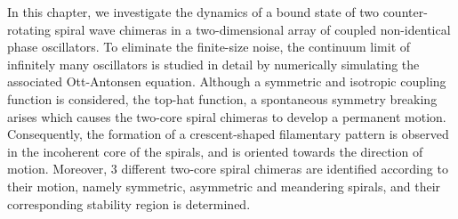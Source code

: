 In this chapter, we investigate the dynamics of a bound state of two counter-rotating spiral wave chimeras
 in a two-dimensional array of coupled non-identical
phase oscillators. To eliminate the finite-size noise, the
continuum limit of infinitely many oscillators is studied in detail
by numerically simulating the
associated Ott-Antonsen equation. Although a symmetric and isotropic coupling function is considered,
the top-hat function, a spontaneous symmetry breaking arises which causes
the two-core spiral chimeras to develop a permanent motion. Consequently,
the formation of a crescent-shaped filamentary pattern is observed in the incoherent core
of the spirals, and is oriented towards the direction of motion.  Moreover, 3 
different two-core spiral chimeras are identified according to their motion, namely symmetric, asymmetric
and meandering spirals, and their corresponding stability region is determined.


 









